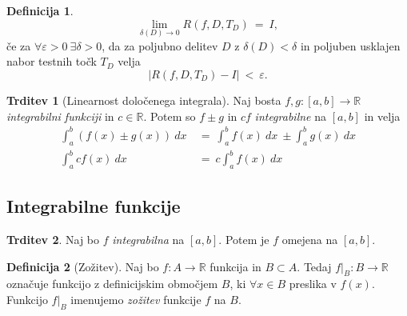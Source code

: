 \documentclass[11pt]{article}
\theoremstyle{definition}
\newtheorem{definicija}{Definicija}[section]
\theoremstyle{definition}
\newtheorem{trditev}{Trditev}[section]
\theoremstyle{definition}
\theoremstyle{theorem}
\begin{document}
\begin{definicija}

$$\lim_{\delta(D) \rightarrow 0} R(f, D, T_D) ~=~ I,$$
če za $\forall \varepsilon > 0 ~ \exists \delta > 0$, da za poljubno delitev $D$ z $\delta(D) < \delta$ in poljuben usklajen nabor testnih točk $T_D$ velja
$$|R(f, D, T_D) - I| ~<~ \varepsilon.$$ 

\end{definicija}
\vspace{0.5cm}

\begin{trditev}[Linearnost določenega integrala]

Naj bosta $f, g: [a, b] \rightarrow \mathbb{R}$ \textit{integrabilni funkciji} in $c \in \mathbb{R}$. Potem so $f \pm g$ in $cf$ \textit{integrabilne} na $[a, b]$ in velja
\begin{align*}
\int_a^b \left( f(x) \pm g(x) \right)~dx ~&=~ \int_a^b f(x)~dx ~\pm \int_a^b g(x)~dx \\
\int_a^b cf(x)~dx ~&=~ c\int_a^b f(x)~dx 
\end{align*}

\end{trditev}
\vspace{0.5cm}


\subsection{Integrabilne funkcije}
\vspace{0.5cm}

\begin{trditev}

Naj bo $f$ \textit{integrabilna} na $[a, b]$. Potem je $f$ omejena na $[a, b]$.

\end{trditev}
\vspace{0.5cm}

\begin{definicija}[Zožitev]

Naj bo $f:A \rightarrow \mathbb{R}$ funkcija in $B \subset A$. Tedaj $f |_B: B \rightarrow \mathbb{R}$ označuje funkcijo z definicijskim območjem $B$, ki $\forall x \in B$ preslika v $f(x)$. Funkcijo $f |_B$ imenujemo \textit{zožitev} funkcije $f$ na $B$.   

\end{definicija}
\vspace{0.5cm}
\end{document}
